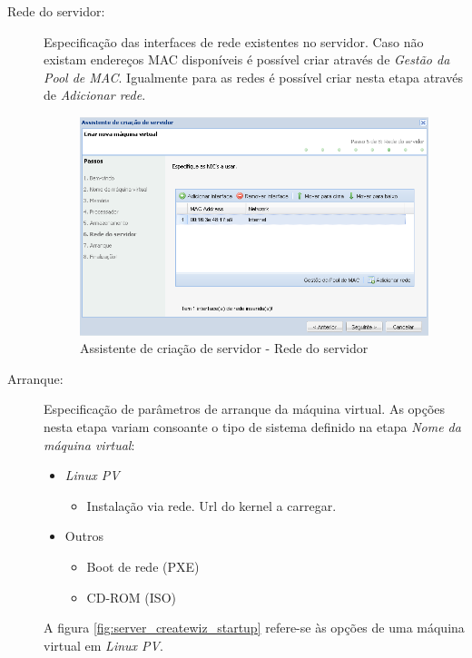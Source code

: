 \begin{description}
        
        \item[Rede do servidor:] Especificação das interfaces de rede existentes no servidor. Caso não existam endereços MAC disponíveis é possível criar através de \emph{Gestão da Pool de MAC}. Igualmente para as redes é possível criar nesta etapa através de \emph{Adicionar rede}.
		\begin{figure}[H]
        		\begin{center}
	        	\includegraphics[scale=0.5]{screenshots/server_createwiz_hostnet.png}
	        	\caption{Assistente de criação de servidor - Rede do servidor}
		        \label{fig:server_createwiz_hostnet}
        		\end{center}
		\end{figure}

        \item[Arranque:] Especificação de parâmetros de arranque da máquina virtual. As opções nesta etapa variam consoante o tipo de sistema definido na etapa \emph{Nome da máquina virtual}:
		\label{sec:add_server_boot}
        \begin{itemize}
			\item \emph{Linux PV}
				\begin{itemize}
					\item Instalação via rede. Url do kernel a carregar.
				\end{itemize}
			\item Outros
				\begin{itemize}
					\item Boot de rede (PXE)
					\item CD-ROM (ISO)
				\end{itemize}
		\end{itemize}
        A figura \ref{fig:server_createwiz_startup} refere-se às opções de uma máquina virtual em \emph{Linux PV}.


\end{description}
